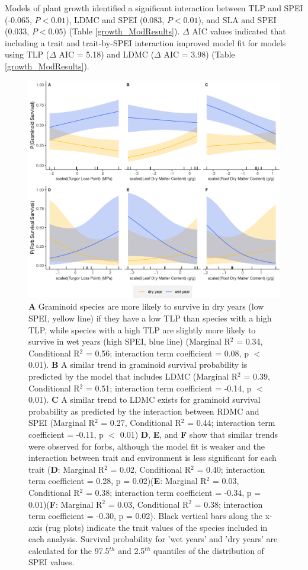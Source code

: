 \documentclass[12pt, letterpaper]{article}
\begin{document}
Models of plant growth identified a significant interaction between TLP and SPEI (-0.065, $P<0.01$), LDMC and SPEI (0.083, $P<0.01$), and SLA and SPEI (0.033, $P<0.05$) (Table \ref{growth_ModResults}). $\Delta$ AIC values indicated that including a trait and trait-by-SPEI interaction improved model fit for models using TLP ($\Delta$ AIC = 5.18) and LDMC ($\Delta$ AIC = 3.98) (Table \ref{growth_ModResults}).  


\begin{figure}
\includegraphics[width=.9\textwidth]{figures/mainObservationsFig-1.pdf}
\caption[width=0.35\textwidth]{\small{\textbf{A} Graminoid species are more likely to survive in dry years (low SPEI, yellow line) if they have a low TLP than species with a high TLP, while species with a high TLP are slightly more likely to survive in wet years (high SPEI, blue line) (Marginal R$^2$ = 0.34, Conditional R$^2$ = 0.56; interaction term coefficient = 0.08, p $<$ 0.01). \textbf{B} A similar trend in graminoid survival probability is predicted by the model that includes LDMC (Marginal R$^2$ = 0.39, Conditional R$^2$ = 0.51; interaction term coefficient = -0.14, p $<$ 0.01). \textbf{C} A similar trend to LDMC exists for graminoid survival probability as predicted by the interaction between RDMC and SPEI (Marginal R$^2$ = 0.27, Conditional R$^2$ = 0.44; interaction term coefficient = -0.11, p $<$ 0.01)
\textbf{D}, \textbf{E}, and \textbf{F} show that similar trends were observed for forbs, although the model fit is weaker and the interaction between trait and environment is less significant for each trait (\textbf{D}: Marginal R$^2$ = 0.02, Conditional R$^2$ = 0.40; interaction term coefficient = 0.28, p = 0.02)(\textbf{E}: Marginal R$^2$ = 0.03, Conditional R$^2$ = 0.38; interaction term coefficient = -0.34, p = 0.01)(\textbf{F}: Marginal R$^2$ = 0.03, Conditional R$^2$ = 0.38; interaction term coefficient = -0.30, p = 0.02). Black vertical bars along the x-axis (rug plots) indicate the trait values of the species included in each analysis. Survival probability for 'wet years' and 'dry years' are calculated for the 97.5$^{th}$ and 2.5$^{th}$ quantiles of the distribution of SPEI values.
}}
\label{fig:PredsObs}
\end{figure}
\end{document}
